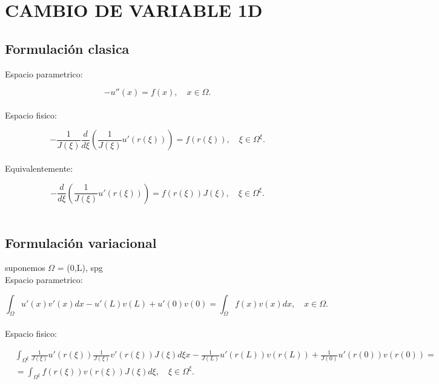 \documentclass[12pt]{article}
\begin{document}
\section{CAMBIO DE VARIABLE 1D}
\subsection{Formulación clasica}

Espacio parametrico:

\begin{equation*}
-u''(x) = f(x), \quad x \in \Omega .
\end{equation*}\\

Espacio fisico:

\begin{equation*}
-\frac{1}{J(\xi)} \frac{d}{d\xi} \left( \frac{1}{J(\xi)} u'(r(\xi)) \right) = f(r(\xi)), \quad \xi \in \Omega^{\xi} .
\end{equation*}\\

Equivalentemente:

\begin{equation}
-\frac{d}{d\xi} \left( \frac{1}{J(\xi)} u'(r(\xi)) \right) = f(r(\xi))J(\xi), \quad \xi \in \Omega^{\xi} .
\end{equation}\\


\subsection{Formulación variacional}
suponemos $\Omega$ = (0,L), spg\\
Espacio parametrico:

\begin{equation*}
\int_{\Omega} u'(x)v'(x)dx-u'(L)v(L)+u'(0)v(0) = \int_{\Omega} f(x)v(x)dx, \quad x \in \Omega .
\end{equation*}\\

Espacio fisico:

\begin{align*}
&\int_{\Omega^{\xi}} \frac{1}{J(\xi)} u'(r(\xi)) \frac{1}{J(\xi)} v'(r(\xi)) J(\xi) d\xi x-\frac{1}{J(L)}u'(r(L))v(r(L))+\frac{1}{J(0)}u'(r(0))v(r(0)) =\\
&=\int_{\Omega^{\xi}} f(r(\xi))v(r(\xi)) J(\xi) d\xi, \quad \xi \in \Omega^{\xi} .
\end{align*}\\
\end{document}
